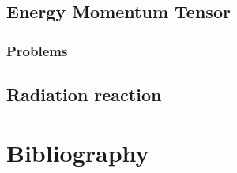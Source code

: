   \chapter{Energy Momentum Tensor}
      
      
      
      \section{Problems}
         
         
         
         
         
         

   \chapter{Radiation reaction}
      
      
      
      

\part{Bibliography}
